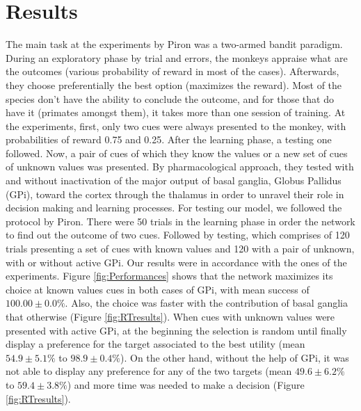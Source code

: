 \section{Results}

	The main task at the experiments by Piron was a two-armed bandit paradigm. During an exploratory phase by trial and errors, the monkeys appraise what are the outcomes (various probability of reward in most of the cases). Afterwards, they choose preferentially the best option (maximizes the reward). Most of the species don't have the ability to conclude the outcome, and for those that do have it (primates amongst them), it takes more than one session of training. 
	At the experiments, first, only two cues were always presented to the monkey, with probabilities of reward 0.75 and 0.25. After the learning phase, a testing one followed. Now, a pair of cues of which they know the values or  a new set of cues of unknown values was presented. By pharmacological approach, they tested with and without inactivation of the major output of basal ganglia, Globus Pallidus (GPi), toward the cortex through the thalamus in order to unravel their role in decision making and learning processes.
	For testing our model, we followed the protocol by Piron. There were 50 trials in the learning phase in order the network to find out the outcome of two cues. Followed by testing, which comprises of 120 trials presenting a set of cues with known values and 120 with a pair of unknown, with or without active GPi.
	Our results were in accordance with the ones of the experiments. Figure \ref{fig:Performances} shows that the network maximizes its choice at known values cues in both cases of GPi, with mean success of  $100.00\pm 0.0\%$. Also, the choice was faster with the contribution of basal ganglia that otherwise (Figure \ref{fig:RTresults}). When cues with unknown values were presented with active GPi, at the beginning the selection is random until finally display a preference for the target associated to the best utility (mean $54.9 \pm 5.1\%$ to $98.9 \pm 0.4\%$). On the other hand, without the help of GPi, it was not able to display any preference for any of the two targets (mean $49.6 \pm 6.2\%$ to  $59.4\pm 3.8\%$) and more time was needed to make a decision (Figure \ref{fig:RTresults}). 